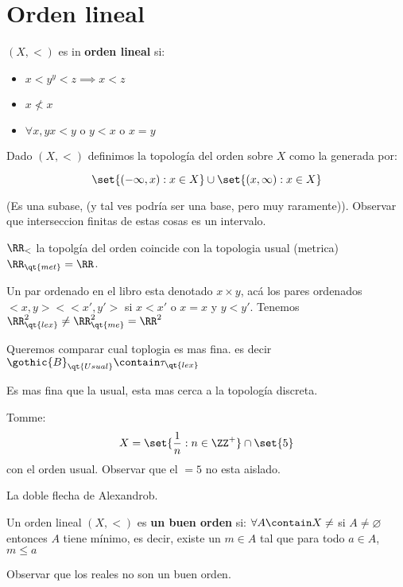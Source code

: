 \section{Orden lineal}
\begin{define}
	$ (X, < ) $ es in \textbf{orden lineal } si:
	\begin{itemize}
		\item $ x < y ^y < z \implies x < z $
		\item $ x \not< x$
		\item $\forall x,y x<y \textrm{ o } y < x \textrm{ o } x =y $ 
	\end{itemize}
\end{define}

Dado $ (X, <) $ definimos la topología del orden sobre $ X$ como la generada por:

\[ \set{(- \infty ,x): x \in X} \cup \set{(x, \infty) : x \in X} \]

(Es una subase, (y tal ves podría ser una base, pero muy raramente)). 
Observar que interseccion finitas de estas cosas es un intervalo. 

\begin{exm}
	$ \RR_< $ la topolgía del orden coincide con la topologia usual (metrica) $ \RR_{\qt{met}} = \RR $. 
\end{exm}

\begin{exm}
	Un par ordenado en el libro esta denotado $ x \times y$, acá los pares ordenados $ \big<x,y\big> < \big<x',y'\big> $ si $ x < x'$ o $ x = x$ y $ y < y'$. Tenemos $ \RR_{\qt{lex}}^2 \neq \RR_{\qt{me}}^2 = \RR^2 $
\end{exm}
 
 Queremos comparar cual toplogia es mas fina. es decir $ \gothic{B}_{\qt{Usual}} \contain \tau_{\qt{lex}} $

Es mas fina que la usual, esta mas cerca a la topología discreta.

\begin{exm}
	Tomme: \[  X = \set{\frac{1}{n}:  n \in \ZZ^+} \cap \set{5} \]
	con el orden usual. Observar que el $=5 $ no esta aislado.
\end{exm}
\begin{exm}
	La doble flecha de Alexandrob.
\end{exm}
\begin{define}
	Un orden lineal $ (X,<)$ es \textbf{un buen orden} si: $ \forall A \contain X \neq $ si $ A \neq \varnothing$ entonces $A$ tiene mínimo, es decir, existe un $m \in A$ tal que para todo $ a \in A$, $ m \leq a$ 
\end{define}
Observar que los reales no son un buen orden.

